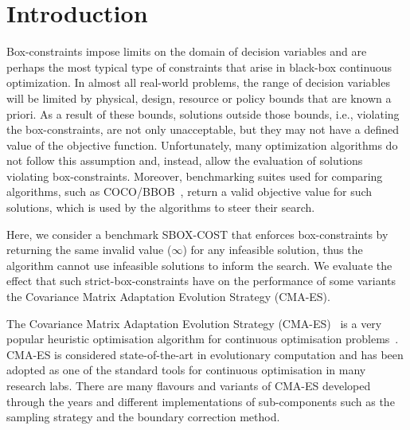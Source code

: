 \documentclass[sigconf=true, nonacm=false, review=true, anonymous = false,screen=true]{acmart}
\begin{document}



\maketitle

\section{Introduction}
Box-constraints impose limits on the domain of decision variables and are perhaps the most typical type of constraints that arise in black-box continuous optimization. In almost all real-world problems, the range of decision variables will be limited by physical, design, resource or policy bounds that are known a priori. As a result of these bounds, solutions outside those bounds, i.e., violating the box-constraints, are not only unacceptable, but they may not have a defined value of the objective function. Unfortunately, many optimization algorithms do not follow this assumption and, instead, allow the evaluation of solutions violating box-constraints. Moreover, benchmarking suites used for comparing algorithms, such as COCO/BBOB~\cite{hansen2020coco}, return a valid objective value for such solutions, which is used by the algorithms to steer their search.

Here, we consider a benchmark SBOX-COST that enforces box-constraints by returning the same invalid value ($\infty$) for any infeasible solution, thus the algorithm cannot use infeasible solutions to inform the search. We evaluate the effect that such strict-box-constraints have on the performance of some variants the Covariance Matrix Adaptation Evolution Strategy (CMA-ES).

The Covariance Matrix Adaptation Evolution Strategy (CMA-ES)~\cite{Hansen.1996} is a very popular heuristic optimisation algorithm for continuous optimisation problems~\cite{vermetten_gecco2022}. CMA-ES is considered state-of-the-art in evolutionary computation and has been adopted as one of the standard tools for continuous optimisation in many research labs. There are many flavours and variants of CMA-ES developed through the years and different implementations of sub-components such as the sampling strategy and the boundary correction method.
\end{document}

